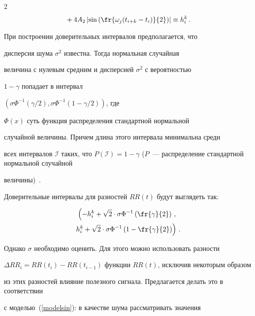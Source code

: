 \begin{multicols}{2}
\begin{multline}
   {}+4A_2\left|\sin\left(\fr{\omega_j (t_{i+k}-t_i)}{2}\right)\right| \equiv h_i^k\,.


\end{multline}





При построении доверительных интервалов предполагается, что


дисперсия шума $\sigma^2$ известна. Тогда нормальная случайная


величина с нулевым средним и дисперсией $\sigma^2$ с вероятностью


$1-\gamma$ попадает в интервал


$\left(\sigma\Phi^{-1}\left(\gamma/2\right),


\sigma\Phi^{-1}\left(1-\gamma/2\right)\right)$, где


$\Phi(x)$ суть функция распределения стандартной нормальной


случайной величины. Причем длина этого интервала минимальна среди


всех интервалов $\mathcal{I}$ таких, что $P(\mathcal{I}) =


1-\gamma$ ($P$~--- распределение стандартной нормальной случайной


величины)~\cite{4ma}.





Доверительные интервалы для разностей $RR(t)$ будут выглядеть так:


\begin{multline}


\label{confint}


\left( - h_i^k + \sqrt{2}\cdot\sigma\Phi^{-1}\left(\fr{\gamma}{2}\right)\,,\right.\\


\left. h_i^k + \sqrt{2}\cdot\sigma\Phi^{-1}\left(1-\fr{\gamma}{2}\right) \right)\,.


\end{multline}





Однако $\sigma$ необходимо оценить. Для этого можно использовать разности 


$\Delta RR_i=RR(t_i)-RR(t_{i-1})$ функции $RR(t)$, исключив некоторым образом 


из этих разностей влияние полезного сигнала. Предлагается делать это в соответствии 


с моделью~(\ref{modelsin}): в качестве шума рассматривать значения



\end{multicols}
